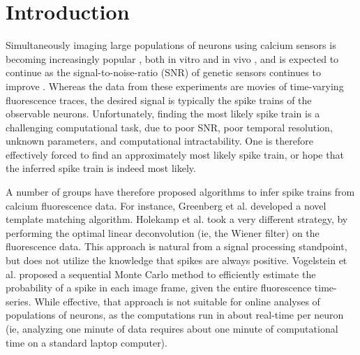 \section{Introduction}


Simultaneously imaging large populations of neurons using calcium sensors is becoming increasingly popular \cite{ImagingManual}, both in vitro \cite{SmettersYuste99, IkegayaYuste04} and in vivo \cite{NagayamaChen07, GobelHelmchen07, LuoSvoboda08}, and is expected to continue as the signal-to-noise-ratio (SNR) of genetic sensors continues to improve \cite{GaraschukKonnerth07, MankGriesbeck08, WallaceHasan08}. 
Whereas the data from these experiments are movies of time-varying fluorescence traces, the desired signal is typically the spike trains of the observable neurons. Unfortunately, finding the most likely spike train is a challenging computational task, due to poor SNR, poor temporal resolution, unknown parameters, and computational intractability. One is therefore effectively forced to find an approximately most likely spike train, or hope that the inferred spike train is indeed most likely. 

A number of groups have therefore proposed algorithms to infer spike trains from calcium fluorescence data.  For instance, Greenberg et al. \cite{GreenbergKerr08} developed a novel template matching algorithm. %
Holekamp et al. \cite{HolekampHoly08} took a very different strategy, by performing the optimal linear deconvolution (ie, the Wiener filter) on the fluorescence data.  This approach is natural from a signal processing standpoint, but does not utilize the knowledge that spikes are always positive.  Vogelstein et al. \cite{VogelsteinPaninski09} proposed a sequential Monte Carlo method to efficiently estimate the probability of a spike in each image frame, given the entire fluorescence time-series.  While effective, that approach is not suitable for online analyses of populations of neurons, as the computations run in about real-time per neuron (ie, analyzing one minute of data requires about one minute of computational time on a standard laptop computer).

